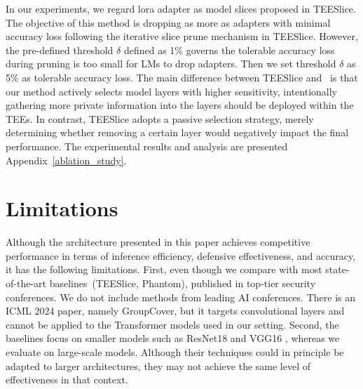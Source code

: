 In our experiments, we regard lora adapter as model slices proposed in TEESlice. The objective of this method is dropping as more as adapters with minimal accuracy loss following the iterative slice prune mechanism in TEESlice. However, the pre-defined threshold $\delta$ defined as 1\% governs the tolerable accuracy loss during pruning is too small for LMs to drop adapters. Then we set threshold $\delta$ as 5\% as tolerable accuracy loss. The main difference between TEESlice and \method~is that our method actively selects model layers with higher sensitivity, intentionally gathering more private information into the layers should be deployed within the TEEs. In contrast, TEESlice adopts a passive selection strategy, merely determining whether removing a certain layer would negatively impact the final performance. The experimental results and analysis are presented Appendix~\ref{ablation_study}.

\section{Limitations}
\label{limitation}
Although the architecture presented in this paper achieves competitive performance in terms of inference efficiency, defensive effectiveness, and accuracy, it has the following limitations. 
First, even though we compare \method with most state-of-the-art baselines~(TEESlice\cite{zhang2024no}, Phantom\cite{AnonymousCoder2025Phantom}), published in top-tier security conferences. We do not include methods from leading AI conferences. There is an ICML 2024 paper, namely GroupCover\cite{zhang2024groupcover}, but it targets convolutional layers and cannot be applied to the Transformer models used in our setting.
Second, the baselines focus on smaller models such as ResNet18 \cite{he2016deep_resnet} and VGG16 \cite{simonyan2014vgg}, whereas we evaluate on large-scale models. Although their techniques could in principle be adapted to larger architectures, they may not achieve the same level of effectiveness in that context.





